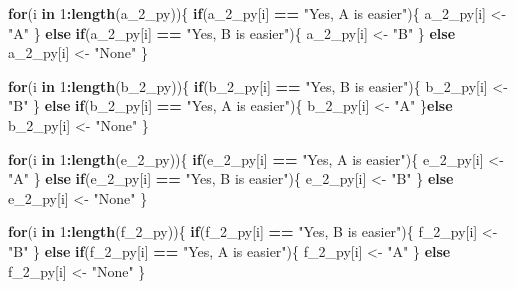 \documentclass[
]{article}
\newenvironment{Shaded}{\begin{snugshade}}{\end{snugshade}}
\newcommand{\ControlFlowTok}[1]{\textcolor[rgb]{0.13,0.29,0.53}{\textbf{#1}}}
\newcommand{\DecValTok}[1]{\textcolor[rgb]{0.00,0.00,0.81}{#1}}
\newcommand{\KeywordTok}[1]{\textcolor[rgb]{0.13,0.29,0.53}{\textbf{#1}}}
\newcommand{\NormalTok}[1]{#1}
\newcommand{\OperatorTok}[1]{\textcolor[rgb]{0.81,0.36,0.00}{\textbf{#1}}}
\newcommand{\StringTok}[1]{\textcolor[rgb]{0.31,0.60,0.02}{#1}}
\begin{document}
\begin{Shaded}
\begin{Highlighting}[]
\ControlFlowTok{for}\NormalTok{(i }\ControlFlowTok{in} \DecValTok{1}\OperatorTok{:}\KeywordTok{length}\NormalTok{(a_}\DecValTok{2}\NormalTok{_py))\{}
  \ControlFlowTok{if}\NormalTok{(a_}\DecValTok{2}\NormalTok{_py[i] }\OperatorTok{==}\StringTok{ "Yes, A is easier"}\NormalTok{)\{}
\NormalTok{    a_}\DecValTok{2}\NormalTok{_py[i] <-}\StringTok{ "A"}
\NormalTok{  \} }\ControlFlowTok{else} \ControlFlowTok{if}\NormalTok{(a_}\DecValTok{2}\NormalTok{_py[i] }\OperatorTok{==}\StringTok{ "Yes, B is easier"}\NormalTok{)\{}
\NormalTok{  a_}\DecValTok{2}\NormalTok{_py[i] <-}\StringTok{ "B"}
\NormalTok{  \} }\ControlFlowTok{else}\NormalTok{ a_}\DecValTok{2}\NormalTok{_py[i] <-}\StringTok{ "None"}
\NormalTok{\}}

\ControlFlowTok{for}\NormalTok{(i }\ControlFlowTok{in} \DecValTok{1}\OperatorTok{:}\KeywordTok{length}\NormalTok{(b_}\DecValTok{2}\NormalTok{_py))\{}
  \ControlFlowTok{if}\NormalTok{(b_}\DecValTok{2}\NormalTok{_py[i] }\OperatorTok{==}\StringTok{ "Yes, B is easier"}\NormalTok{)\{}
\NormalTok{    b_}\DecValTok{2}\NormalTok{_py[i] <-}\StringTok{ "B"}
\NormalTok{  \} }\ControlFlowTok{else} \ControlFlowTok{if}\NormalTok{(b_}\DecValTok{2}\NormalTok{_py[i] }\OperatorTok{==}\StringTok{ "Yes, A is easier"}\NormalTok{)\{ }
\NormalTok{    b_}\DecValTok{2}\NormalTok{_py[i] <-}\StringTok{ "A"}
\NormalTok{    \}}\ControlFlowTok{else}\NormalTok{ b_}\DecValTok{2}\NormalTok{_py[i] <-}\StringTok{ "None"}
\NormalTok{\}}

\ControlFlowTok{for}\NormalTok{(i }\ControlFlowTok{in} \DecValTok{1}\OperatorTok{:}\KeywordTok{length}\NormalTok{(e_}\DecValTok{2}\NormalTok{_py))\{}
  \ControlFlowTok{if}\NormalTok{(e_}\DecValTok{2}\NormalTok{_py[i] }\OperatorTok{==}\StringTok{ "Yes, A is easier"}\NormalTok{)\{}
\NormalTok{    e_}\DecValTok{2}\NormalTok{_py[i] <-}\StringTok{ "A"}
\NormalTok{  \} }\ControlFlowTok{else} \ControlFlowTok{if}\NormalTok{(e_}\DecValTok{2}\NormalTok{_py[i] }\OperatorTok{==}\StringTok{ "Yes, B is easier"}\NormalTok{)\{}
\NormalTok{    e_}\DecValTok{2}\NormalTok{_py[i] <-}\StringTok{ "B"}
\NormalTok{  \} }\ControlFlowTok{else}\NormalTok{ e_}\DecValTok{2}\NormalTok{_py[i] <-}\StringTok{ "None"}
\NormalTok{\}}

\ControlFlowTok{for}\NormalTok{(i }\ControlFlowTok{in} \DecValTok{1}\OperatorTok{:}\KeywordTok{length}\NormalTok{(f_}\DecValTok{2}\NormalTok{_py))\{}
  \ControlFlowTok{if}\NormalTok{(f_}\DecValTok{2}\NormalTok{_py[i] }\OperatorTok{==}\StringTok{ "Yes, B is easier"}\NormalTok{)\{}
\NormalTok{    f_}\DecValTok{2}\NormalTok{_py[i] <-}\StringTok{ "B"}
\NormalTok{  \} }\ControlFlowTok{else} \ControlFlowTok{if}\NormalTok{(f_}\DecValTok{2}\NormalTok{_py[i] }\OperatorTok{==}\StringTok{ "Yes, A is easier"}\NormalTok{)\{}
\NormalTok{    f_}\DecValTok{2}\NormalTok{_py[i] <-}\StringTok{ "A"}
\NormalTok{  \} }\ControlFlowTok{else}\NormalTok{ f_}\DecValTok{2}\NormalTok{_py[i] <-}\StringTok{ "None"}
\NormalTok{\}}


\end{Highlighting}
\end{Shaded}
\end{document}
